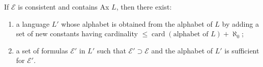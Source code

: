 If $\mathcal{E}$ is consistent and contains Ax $L$, then there exist:
\begin{enumerate}
\item[(a)] a language $L'$ whose alphabet is obtained from the alphabet of $L$ by adding a set of new constants having cardinality $\leqslant \operatorname{card}(\text{alphabet of } L) + \aleph_0$;
\item[(b)] a set of formulas $\mathcal{E}'$ in $L'$ such that $\mathcal{E}' \supset \mathcal{E}$ and the alphabet of $L'$ is sufficient for $\mathcal{E}'$.
\end{enumerate}
